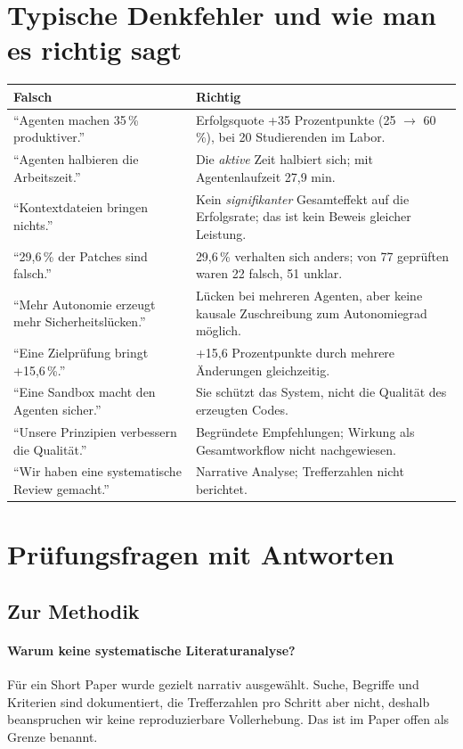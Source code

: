 \documentclass[11pt,a4paper,parskip=half]{scrartcl}
\newcommand{\frage}[2]{\paragraph{#1}#2\par}
\begin{document}
\section{Typische Denkfehler und wie man es richtig sagt}
\begin{center}\small
\begin{tabularx}{\textwidth}{@{}>{\color{rot}}L>{\color{gruen!60!black}}L@{}}
\toprule
\textbf{Falsch} & \textbf{Richtig} \\
\midrule
\enquote{Agenten machen 35\,\% produktiver.} & Erfolgsquote +35 Prozentpunkte (25 \(\rightarrow\) 60\,\%), bei 20 Studierenden im Labor. \\
\enquote{Agenten halbieren die Arbeitszeit.} & Die \emph{aktive} Zeit halbiert sich; mit Agentenlaufzeit 27,9 min. \\
\enquote{Kontextdateien bringen nichts.} & Kein \emph{signifikanter} Gesamteffekt auf die Erfolgsrate; das ist kein Beweis gleicher Leistung. \\
\enquote{29,6\,\% der Patches sind falsch.} & 29,6\,\% verhalten sich anders; von 77 geprüften waren 22 falsch, 51 unklar. \\
\enquote{Mehr Autonomie erzeugt mehr Sicherheitslücken.} & Lücken bei mehreren Agenten, aber keine kausale Zuschreibung zum Autonomiegrad möglich. \\
\enquote{Eine Zielprüfung bringt +15,6\,\%.} & +15,6 Prozentpunkte durch mehrere Änderungen gleichzeitig. \\
\enquote{Eine Sandbox macht den Agenten sicher.} & Sie schützt das System, nicht die Qualität des erzeugten Codes. \\
\enquote{Unsere Prinzipien verbessern die Qualität.} & Begründete Empfehlungen; Wirkung als Gesamtworkflow nicht nachgewiesen. \\
\enquote{Wir haben eine systematische Review gemacht.} & Narrative Analyse; Trefferzahlen nicht berichtet. \\
\bottomrule
\end{tabularx}
\end{center}

\section{Prüfungsfragen mit Antworten}

\subsection*{Zur Methodik}
\frage{Warum keine systematische Literaturanalyse?}{Für ein Short Paper wurde gezielt narrativ ausgewählt. Suche, Begriffe und Kriterien sind dokumentiert, die Trefferzahlen pro Schritt aber nicht, deshalb beanspruchen wir keine reproduzierbare Vollerhebung. Das ist im Paper offen als Grenze benannt.}
\end{document}
